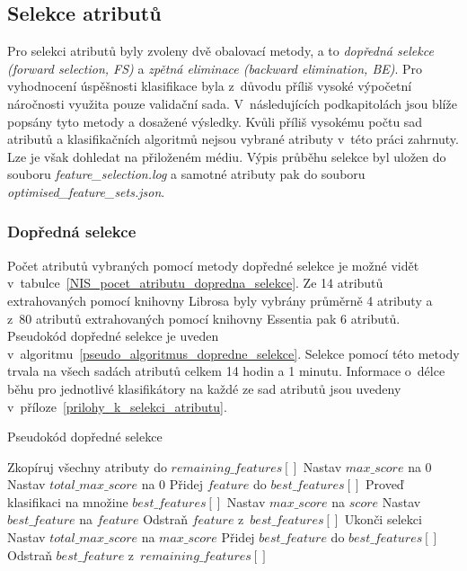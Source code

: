 \subsection*{Selekce atributů}
\label{NIS_selekce_atributu}
Pro selekci atributů byly zvoleny dvě obalovací metody, a to \textit{dopředná selekce (forward selection, FS)} a \textit{zpětná eliminace (backward elimination, BE)}. Pro vyhodnocení úspěšnosti klasifikace byla z~důvodu příliš vysoké výpočetní náročnosti využita pouze validační sada. V~následujících podkapitolách jsou blíže popsány tyto metody a dosažené výsledky. Kvůli příliš vysokému počtu sad atributů a klasifikačních algoritmů nejsou vybrané atributy v~této práci zahrnuty. Lze je však dohledat na přiloženém médiu. Výpis průběhu selekce byl uložen do souboru \textit{feature\_selection.log} a samotné atributy pak do souboru \textit{optimised\_feature\_sets.json}.

\subsubsection*{Dopředná selekce}
\label{NIS_dopredna_selekce}
Počet atributů vybraných pomocí metody dopředné selekce je možné vidět v~tabulce~\ref{NIS_pocet_atributu_dopredna_selekce}. Ze 14 atributů extrahovaných pomocí knihovny Librosa byly vybrány průměrně 4 atributy a z~80 atributů extrahovaných pomocí knihovny Essentia pak 6 atributů. Pseudokód dopředné selekce je uveden v~algoritmu~\ref{pseudo_algoritmus_dopredne_selekce}. Selekce pomocí této metody trvala na všech sadách atributů celkem 14 hodin a 1 minutu. Informace o~délce běhu pro jednotlivé klasifikátory na každé ze sad atributů jsou uvedeny v~příloze~\ref{prilohy_k_selekci_atributu}.

\begin{algorithm}
    \caption{Pseudokód dopředné selekce}
    \label{pseudo_algoritmus_dopredne_selekce}
    \begin{algorithmic}[1]
        \State Zkopíruj všechny atributy do $remaining\_features[]$
        \State Nastav $max\_score$ na $0$
        \State Nastav $total\_max\_score$ na $0$
                \State Přidej $feature$ do $best\_features[]$
                \State Proveď klasifikaci na množine $best\_features[]$
                    \State Nastav $max\_score$ na $score$
                    \State Nastav $best\_feature$ na $feature$
                \EndIf
                \State Odstraň $feature$ z~$best\_features[]$
            \EndFor
                \State Ukonči selekci
            \EndIf
            \State Nastav $total\_max\_score$ na $max\_score$
            \State Přidej $best\_feature$ do $best\_features[]$
            \State Odstraň $best\_feature$ z~$remaining\_features[]$
        \EndWhile
    \end{algorithmic}
\end{algorithm}

